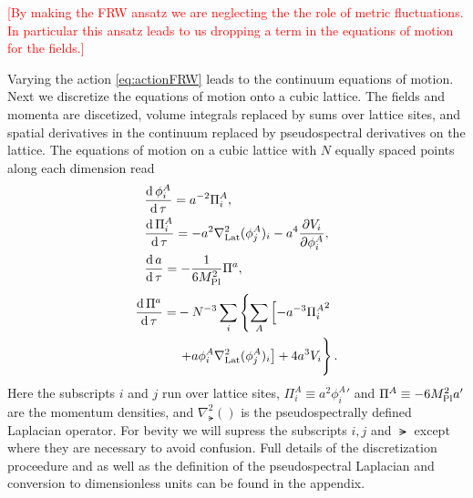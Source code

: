 \textcolor{red}{[By making the FRW ansatz we are neglecting the the role of metric fluctuations. In particular this ansatz leads to us dropping a term in the equations of motion for the fields.]}

Varying the action \eqref{eq:actionFRW} leads to the continuum equations of motion. Next we discretize the equations of motion onto a cubic lattice. The fields and momenta are discetized, volume integrals replaced by sums over lattice sites, and spatial derivatives in the continuum replaced by pseudospectral derivatives on the lattice. The equations of motion on a cubic lattice with $N$ equally spaced points along each dimension read
\begin{align}
  & \frac{\mathrm{d}\,\phi^A_i}{\mathrm{d}\,\tau} = a^{-2}\Pi^A_i,  \label{eq:lat eom a}\\
  & \frac{\mathrm{d}\,\Pi^A_i}{\mathrm{d}\,\tau} = -a^2\nabla^2_{\mathrm{Lat}}(\phi^A_j)_i -a^4\frac{\partial V_i}{\partial \phi^A_i},  \label{eq:lat eom pi a}\\
  & \frac{\mathrm{d}\, a}{\mathrm{d}\,\tau} = -\frac{1}{6M_{\mathrm{Pl}}^2}\Pi^a,  \label{eq:lat eom phi}
\end{align}
\begin{align}
  \begin{split}
    \frac{\dd\Pi^a}{\dd\tau} = &-N^{-3}\sum_i\left\{
    \sum_A\left[-a^{-3}{\Pi^A_i}^2 \right.\right. \\
    &  \left.\left. + a\phi^A_i\nabla^2_\lat(\phi^A_j)_i \right]%
    + 4a^3V_i\vphantom{\sum_A}\right\}.
  \end{split} \label{eq:lat eom pi phi}  
\end{align}
Here the subscripts $i$ and $j$ run over lattice sites, $\Pi^A_i \equiv a^2{\phi^A_i}'$ and $\Pi^A \equiv -6M_{\mathrm{Pl}}^2a'$ are the momentum densities, and $\nabla^2_\lat()$ is the pseudospectrally defined Laplacian operator.
For bevity we will supress the subscripts $i,j$ and $\lat$ except where they are necessary to avoid confusion.
Full details of the discretization proceedure and as well as the definition of the pseudospectral Laplacian and conversion to dimensionless units can be found in the appendix.

